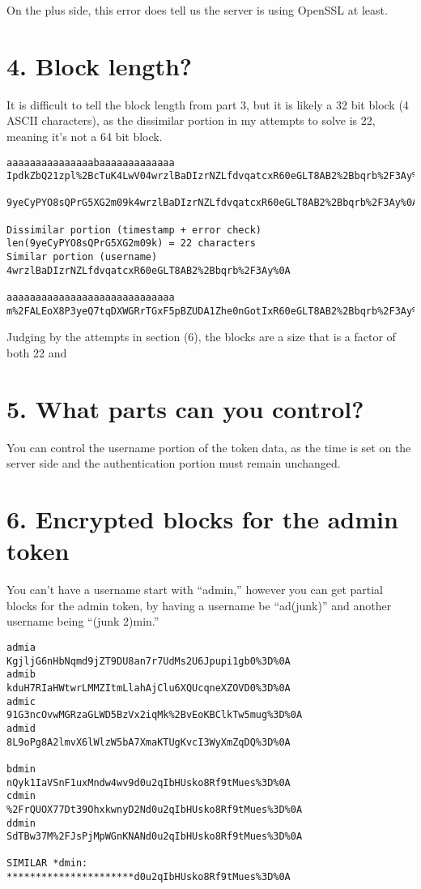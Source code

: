 \documentclass[12pt,letterpaper]{article}
\begin{document}
On the plus side, this error does tell us the server is using OpenSSL at least.

\section*{4. Block length?}
It is difficult to tell the block length from part 3, but it is likely
a 32 bit block (4 ASCII characters), as the dissimilar portion in my attempts
to solve is 22, meaning it's not a 64 bit block.

\begin{verbatim}
aaaaaaaaaaaaaaabaaaaaaaaaaaaa 
IpdkZbQ21zpl%2BcTuK4LwV04wrzlBaDIzrNZLfdvqatcxR60eGLT8AB2%2Bbqrb%2F3Ay%0A
 9yeCyPYO8sQPrG5XG2m09k4wrzlBaDIzrNZLfdvqatcxR60eGLT8AB2%2Bbqrb%2F3Ay%0A

Dissimilar portion (timestamp + error check)
len(9yeCyPYO8sQPrG5XG2m09k) = 22 characters
Similar portion (username)
4wrzlBaDIzrNZLfdvqatcxR60eGLT8AB2%2Bbqrb%2F3Ay%0A

aaaaaaaaaaaaaaaaaaaaaaaaaaaaa 
m%2FALEoX8P3yeQ7tqDXWGRrTGxF5pBZUDA1Zhe0nGotIxR60eGLT8AB2%2Bbqrb%2F3Ay%0A
\end{verbatim}

Judging by the attempts in section (6), the blocks are a size
that is a factor of both 22 and
\section*{5. What parts can you control?}
You can control the username portion of the token data, as the time
is set on the server side and the authentication portion must
remain unchanged.

\section*{6. Encrypted blocks for the admin token}
You can't have a username start with ``admin,'' however you can
get partial blocks for the admin token, by having a username be
``ad(junk)'' and another username being ``(junk 2)min.''

\begin{verbatim}
admia
KgjljG6nHbNqmd9jZT9DU8an7r7UdMs2U6Jpupi1gb0%3D%0A
admib
kduH7RIaHWtwrLMMZItmLlahAjClu6XQUcqneXZOVD0%3D%0A
admic
91G3ncOvwMGRzaGLWD5BzVx2iqMk%2BvEoKBClkTw5mug%3D%0A
admid
8L9oPg8A2lmvX6lWlzW5bA7XmaKTUgKvcI3WyXmZqDQ%3D%0A

bdmin
nQyk1IaVSnF1uxMndw4wv9d0u2qIbHUsko8Rf9tMues%3D%0A
cdmin
%2FrQUOX77Dt39OhxkwnyD2Nd0u2qIbHUsko8Rf9tMues%3D%0A
ddmin
SdTBw37M%2FJsPjMpWGnKNANd0u2qIbHUsko8Rf9tMues%3D%0A

SIMILAR *dmin:
**********************d0u2qIbHUsko8Rf9tMues%3D%0A
\end{verbatim}
\end{document}
